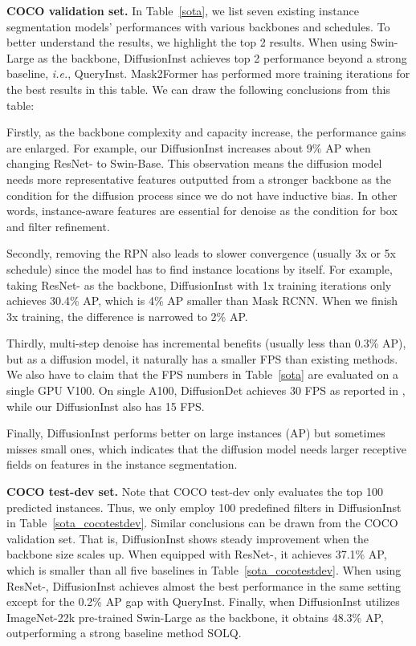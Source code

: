 \documentclass{article}
\begin{document}
\noindent\textbf{COCO validation set.} In Table~\ref{sota}, we list seven existing instance segmentation models' performances with various backbones and schedules. To better understand the results, we highlight the top 2 results. When using Swin-Large as the backbone, DiffusionInst achieves top 2 performance beyond a strong baseline, \emph{i.e.}, QueryInst. Mask2Former has performed more training iterations for the best results in this table. We can draw the following conclusions from this table: 

Firstly, as the backbone complexity and capacity increase, the performance gains are enlarged. For example, our DiffusionInst increases about 9\% AP when changing ResNet- to Swin-Base. This observation means the diffusion model needs more representative features outputted from a stronger backbone as the condition for the diffusion process since we do not have inductive bias. In other words, instance-aware features are essential for denoise as the condition for box and filter refinement. 

Secondly, removing the RPN also leads to slower convergence (usually 3x or 5x schedule) since the model has to find instance locations by itself. For example, taking ResNet- as the backbone, DiffusionInst with 1x training iterations only achieves 30.4\% AP, which is 4\% AP smaller than Mask RCNN. When we finish 3x training, the difference is narrowed to 2\% AP.

Thirdly, multi-step denoise has incremental benefits (usually less than 0.3\% AP), but as a diffusion model, it naturally has a smaller FPS than existing methods. We also have to claim that the FPS numbers in Table~\ref{sota} are evaluated on a single GPU V100. On single A100, DiffusionDet achieves 30 FPS as reported in \cite{DiffusionDet}, while our DiffusionInst also has 15 FPS. 

Finally, DiffusionInst performs better on large instances (AP) but sometimes misses small ones, which indicates that the diffusion model needs larger receptive fields on features in the instance segmentation.

\noindent\textbf{COCO test-dev set.} 
Note that COCO test-dev only evaluates the top 100 predicted instances. Thus, we only employ 100 predefined filters in DiffusionInst in Table~\ref{sota_cocotestdev}. Similar conclusions can be drawn from the COCO validation set. That is, DiffusionInst shows steady improvement when the backbone size scales up. When equipped with ResNet-, it achieves 37.1\% AP, which is smaller than all five baselines in Table~\ref{sota_cocotestdev}. When using ResNet-, DiffusionInst achieves almost the best performance in the same setting except for the 0.2\% AP gap with QueryInst. Finally, when DiffusionInst utilizes ImageNet-22k pre-trained Swin-Large as the backbone, it obtains 48.3\% AP, outperforming a strong baseline method SOLQ.
\end{document}
